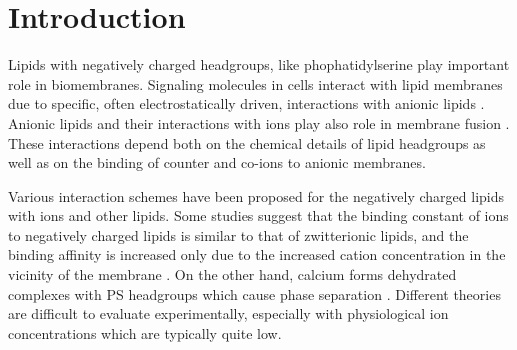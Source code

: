 \documentclass[journal=jpcbfk,manuscript=article]{achemso}
\begin{document}
 
 
 
 
 
 
\section{Introduction} 

Lipids with negatively charged headgroups, like phophatidylserine
play important role in biomembranes. 
Signaling molecules in cells interact with lipid membranes 
due to specific, often electrostatically driven, interactions 
with anionic lipids \cite{lemmon08,leventis10}.
Anionic lipids and their interactions with ions play also role in membrane
fusion \cite{??}. 
These interactions depend both on
the chemical details of lipid headgroups as well as 
on the binding of counter and co-ions to anionic membranes. 

Various interaction schemes have been proposed for the negatively charged
lipids with ions and other lipids. 
Some studies suggest that the
binding constant of ions to negatively charged lipids is similar to that of zwitterionic lipids,
and the binding affinity is increased only due to the increased cation
concentration in the vicinity of the membrane \cite{seelig90,sinn06}.
On the other hand, calcium forms dehydrated complexes with PS headgroups
which cause phase separation \cite{hauser77,kurland79,hauser85,feigenson86,mattai89,roux90,roux91,boettcher11}.
Different theories are difficult to evaluate experimentally,
especially with physiological ion concentrations which are typically quite low.
\end{document}
